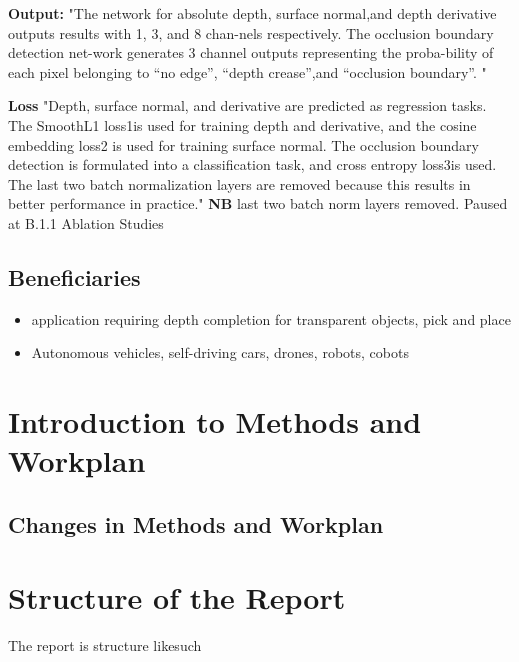\textbf{Output:}
"The network for absolute depth, surface normal,and depth derivative outputs results with 1, 3, and 8 chan-nels  respectively.   The  occlusion  boundary  detection  net-work generates 3 channel outputs representing the proba-bility of each pixel belonging to “no edge”, “depth crease”,and “occlusion boundary”.  "
 
\textbf{Loss} "Depth, surface normal, and derivative are predicted as regression tasks.  The SmoothL1 loss1is used for training depth and derivative, and the cosine embedding loss2 is used for training surface normal.  The occlusion boundary detection is formulated into a classification task, and cross entropy loss3is used. The last two batch normalization layers are removed because this results in better performance in practice." \textbf{NB} last two batch norm layers removed. 
Paused at B.1.1 Ablation Studies

 
\lipsum[1]



\subsection{Beneficiaries}
\begin{itemize}
    \item application requiring depth completion for transparent objects, pick and place
    \item Autonomous vehicles, self-driving cars, drones, robots, cobots
\end{itemize}
\lipsum[1]


\section{Introduction to Methods and Workplan}
\lipsum[1]


\subsection{Changes in Methods and Workplan}
\lipsum[1]



\section{Structure of the Report}
The report is structure likesuch

\lipsum[1]





